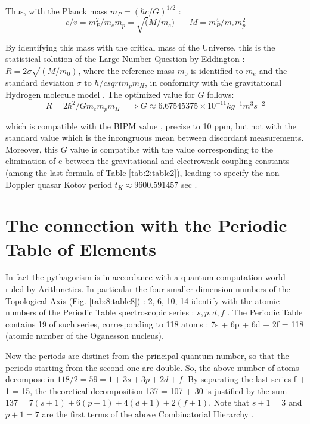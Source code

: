 \documentclass[a4paper,9pt]{article}
\begin{document}
Thus, with the Planck mass $m_P = (\hbar c/G)^{1/2}$ : 
\begin{equation}
c/v = m_P^2/m_em_p = \sqrt(M/m_e)~~~~~~~~   M = m_P^4/m_em_p^2
\end{equation}

By identifying this mass with the critical mass of the Universe, this is the statistical solution \cite{Durham} of the Large Number Question by Eddington  : $R = 2 \sigma \sqrt{(M/m_0)}$, where the reference mass $m_0$ is identified to $m_e$ and the standard deviation $\sigma$ to $\hbar/csqrt{m_pm_H}$, in conformity with the gravitational Hydrogen molecule model \cite{Sanchez}. The optimized value for $G$ follows:
\begin{equation}
R = 2\hbar^2/Gm_em_pm_H  ~~~~  \Rightarrow G \approx 6.67545375 \times 10^{-11}  kg^{-1}m^{3}s^{-2}    
\end{equation}

which is compatible with the BIPM value \cite{Quinn}, precise to 10 ppm, but not with the standard value \cite{Tannabashi} which is the incongruous mean between discordant measurements. Moreover, this $G$ value is compatible with the value corresponding to the elimination of c between the gravitational and electroweak coupling constants (among the last formula of Table \ref{tab:2:table2}), leading to specify the non-Doppler quasar Kotov period $t_K \approx 9600.591457$ sec \cite{Sanchez}.







\section{The connection with the Periodic Table of Elements}

     In fact the pythagorism is in accordance with a quantum computation world ruled by Arithmetics. In particular the four smaller dimension numbers of the Topological Axis (Fig. \ref{tab:8:table8}) : 2, 6, 10, 14 identify with the atomic numbers of the Periodic Table spectroscopic series : $s, p, d, f$ . The Periodic Table contains 19 of such series, corresponding to 118 atoms : 7s + 6p + 6d + 2f = 118 (atomic number of the Oganesson nucleus). 
     

     Now the periods are distinct from the principal quantum number, so that the periods starting from the second one are double. So, the above number of atoms decompose in $118/2 = 59 = 1 + 3s + 3p + 2d + f$.  By separating the last series f + 1 = 15, the theoretical decomposition 137 = 107 + 30 is justified by the sum $137 = 7(s +1) + 6(p +1) + 4(d +1) + 2(f +1)$. Note that $s + 1 = 3$ and $p + 1 = 7$ are the first terms of the above Combinatorial Hierarchy\cite{Bastin} .
\end{document}
